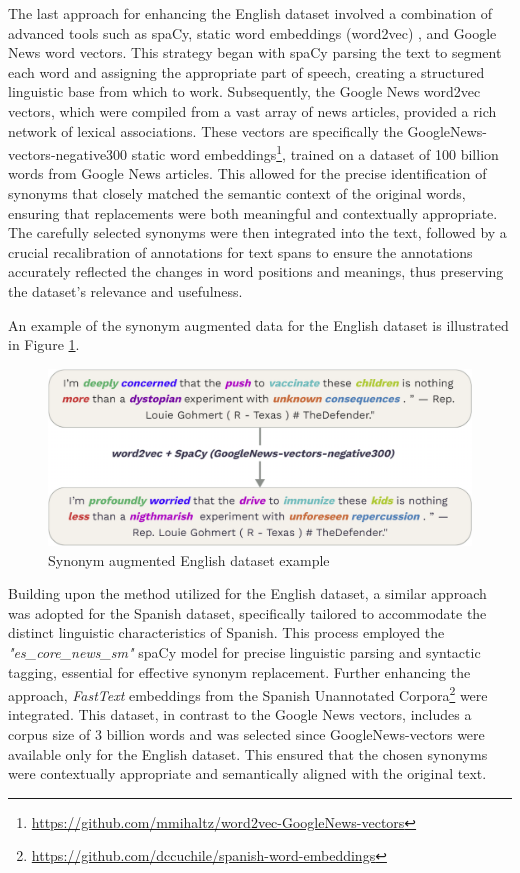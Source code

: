 \documentclass{Configuration_Files/PoliMi3i_thesis}
\begin{document}
The last approach for enhancing the English dataset involved a combination of advanced tools such as spaCy, static word embeddings (word2vec) \cite{mikolov2013distributed}, and Google News word vectors. This strategy began with spaCy parsing the text to segment each word and assigning the appropriate part of speech, creating a structured linguistic base from which to work. Subsequently, the Google News word2vec vectors, which were compiled from a vast array of news articles, provided a rich network of lexical associations. These vectors are specifically the GoogleNews-vectors-negative300 static word embeddings\footnote{\url{https://github.com/mmihaltz/word2vec-GoogleNews-vectors}}, trained on a dataset of 100 billion words from Google News articles. This allowed for the precise identification of synonyms that closely matched the semantic context of the original words, ensuring that replacements were both meaningful and contextually appropriate. The carefully selected synonyms were then integrated into the text, followed by a crucial recalibration of annotations for text spans to ensure the annotations accurately reflected the changes in word positions and meanings, thus preserving the dataset's relevance and usefulness. 

An example of the synonym augmented data for the English dataset is illustrated in Figure \ref{fig:syn_en}.

\begin{figure}[h!]
 \centering
 \includegraphics[width=0.79\linewidth, height=0.23\textheight]{Images/syn_en.png}
 \caption{Synonym augmented English dataset example}
 \label{fig:syn_en}
\end{figure}
\FloatBarrier

Building upon the method utilized for the English dataset, a similar approach was adopted for the Spanish dataset, specifically tailored to accommodate the distinct linguistic characteristics of Spanish. This process employed the \textit{"es\_core\_news\_sm"} spaCy model for precise linguistic parsing and syntactic tagging, essential for effective synonym replacement. Further enhancing the approach, \textit{FastText} embeddings from the Spanish Unannotated Corpora\footnote{\url{https://github.com/dccuchile/spanish-word-embeddings}} were integrated. This dataset, in contrast to the Google News vectors, includes a corpus size of 3 billion words and was selected since GoogleNews-vectors were available only for the English dataset. This ensured that the chosen synonyms were contextually appropriate and semantically aligned with the original text.
\end{document}
